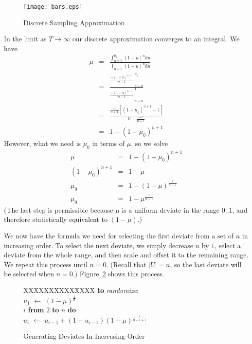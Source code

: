 \documentclass[12pt]{article}
\newcommand{\asgn}{\,\,\leftarrow\,\,}
\newcommand{\du}{{\text{d}u}}
\begin{document}
  \begin{figure}
    \centering
    \texttt{[image: bars.eps]}
    \caption{Discrete Sampling Approximation}\label{fig-calculus}
  \end{figure}

  In the limit as $T\rightarrow\infty$ our discrete
  approximation converges to an integral.  We have
    \begin{eqnarray*}
      \mu &=& \frac{\int_{u=0}^{\mu_0}{(1-u)^n \du}}
                   {\int_{u=0}^{1}{(1-u)^n \du}} \\
	  &=& \frac{\left.\frac{-(1-u)^{n+1}}{n+1}\right|_{u=0}^{\mu_0}}
		   {\left.\frac{-(1-u)^{n+1}}{n+1}\right|_{u=0}^{1}} \\
          &=& \frac{\frac{-1}{n+1}\left[(1-\mu_0)^{n+1}-1\right]}
		   {0-\frac{-1}{n+1}} \\
          &=& 1 - (1 - \mu_0)^{n+1}
    \end{eqnarray*}
  However, what we need is $\mu_0$ in terms of
  $\mu$, so we solve
    \begin{eqnarray*}
       \mu &=& 1 - (1 - \mu_0)^{n+1} \\
       (1 - \mu_0)^{n+1} &=& 1 - \mu \\
       \mu_0 &=& 1 - (1 - \mu)^\frac{1}{n+1} \\
       \mu_0 &=& 1 - \mu^\frac{1}{n+1}
    \end{eqnarray*}
  (The last step is permissible because $\mu$ is a
  uniform deviate in the range $0..1$, and therefore
  statistically equivalent to $(1-\mu)$.)

  We now have the formula we need for selecting the first
  deviate from a set of $n$ in increasing order.  To select
  the next deviate, we simply decrease $n$ by $1$, select a
  deviate from the whole range, and then scale and offset it
  to the remaining range.  We repeat this process until
  $n=0$.  (Recall that $|U|=n$, so the last deviate will be
  selected when $n=0$.)  Figure~\ref{fig-deviate} shows
  this process.
  
  \begin{figure}
    \centering
    \begin{minipage}{0.6\textwidth}
      \begin{tabbing}
      XX\=XXXX\=XXXX\=XXXX\=\kill
      {\bf to} {\it randomize}: \\
      \>$u_1 \asgn (1-\mu)^{\frac{1}{n}}$ \\
       $i$ {\bf from} $2$ {\bf to} $n$ {\bf do} \\
      \>\>$u_i \asgn u_{i-1} + (1-u_{i-1})(1-\mu)^{\frac{1}{n-i+1}}$
    \end{tabbing}
    \end{minipage}
    \caption{Generating Deviates In Increasing Order}\label{fig-deviate}
  \end{figure}
\end{document}
